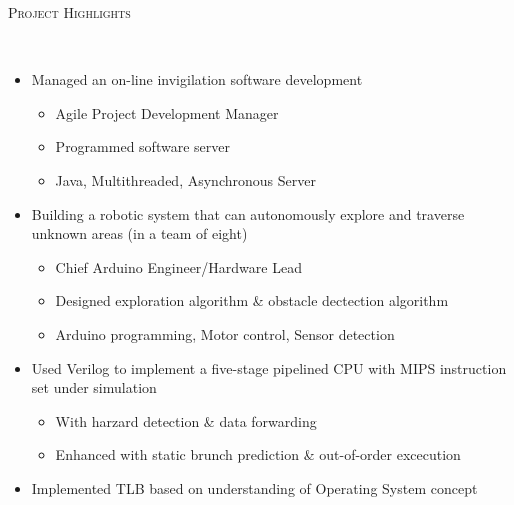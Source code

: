 \documentclass[a4paper, 10pt]{article}
\newenvironment{changemargin}[2]{%
  \begin{list}{}{%
      \setlength{\topsep}{0pt}%
      \setlength{\leftmargin}{#1}%
      \setlength{\rightmargin}{#2}%
      \setlength{\listparindent}{\parindent}%
      \setlength{\itemindent}{\parindent}%
      \setlength{\parsep}{\parskip}%
    }%
  \item[]}{\end{list}
}
\newcommand{\lineover}{
  \begin{changemargin}{-0.05in}{-0.05in}
    \vspace*{-8pt}
    \hrulefill \\
    \vspace*{-2pt}
  \end{changemargin}
}
\newcommand{\header}[1]{
  \begin{changemargin}{-0.5in}{-0.5in}
    \scshape{#1}\\
    \lineover
  \end{changemargin}
}
\newenvironment{body}
{
\vspace*{-16pt}
\begin{changemargin}{-0.25in}{-0.5in}
}	
{
\end{changemargin}
}
\begin{document}
\smallskip
\medskip
%
%
%
%
\header{Project Highlights}
\begin{body}
  \vspace{14pt}
  \begin{itemize} \itemsep 1pt
  \item Managed an on-line invigilation software development
    \begin{itemize} \itemsep -0pt \small
        \item Agile Project Development Manager
        \item Programmed software server
        \item Java, Multithreaded, Asynchronous Server
    \end{itemize}
  \item Building a robotic system that can autonomously explore and traverse unknown areas (in a team of eight)
    \begin{itemize} \itemsep -0pt \small
        \item Chief Arduino Engineer/Hardware Lead
        \item Designed exploration algorithm \& obstacle dectection algorithm
        \item Arduino programming, Motor control, Sensor detection
    \end{itemize}
  \item Used Verilog to implement a five-stage pipelined CPU with MIPS instruction set under simulation
    \begin{itemize} \itemsep -0pt \small
        \item With harzard detection \& data forwarding
        \item Enhanced with static brunch prediction \& out-of-order excecution
    \end{itemize}
  \item Implemented TLB based on understanding of Operating System concept

\end{itemize}
\end{body}
\end{document}
